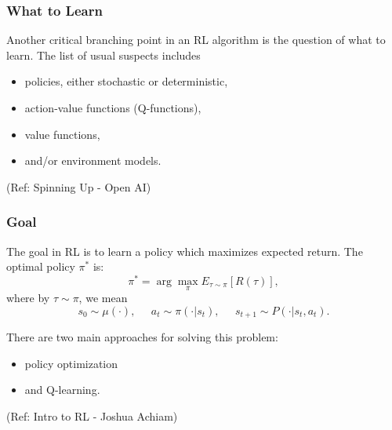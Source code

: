 \begin{frame}[fragile]\frametitle{What to Learn}

Another critical branching point in an RL algorithm is the question of what to learn. The list of usual suspects includes


\begin{itemize}
\item policies, either stochastic or deterministic,
\item action-value functions (Q-functions),
\item value functions,
\item and/or environment models.
\end{itemize}

{\tiny (Ref: Spinning Up - Open AI)}
\end{frame}

\begin{frame}[fragile]\frametitle{Goal}

The goal in RL is to learn a policy which maximizes expected return. The optimal policy $\pi^*$ is:
%
\begin{equation*}
\pi^* = \arg \max_{\pi} E_{\tau \sim \pi}[R(\tau)],
\end{equation*}
%
where by $\tau \sim \pi$, we mean
%
\begin{equation*}
s_0 \sim \mu(\cdot), \;\;\;\;\; a_t \sim \pi(\cdot|s_t), \;\;\;\;\; s_{t+1} \sim P(\cdot | s_t, a_t).
\end{equation*}


There are two main approaches for solving this problem:
\begin{itemize}
\item policy optimization
\item and Q-learning.
\end{itemize}


{\tiny (Ref: Intro to RL - Joshua Achiam)}


\end{frame}

